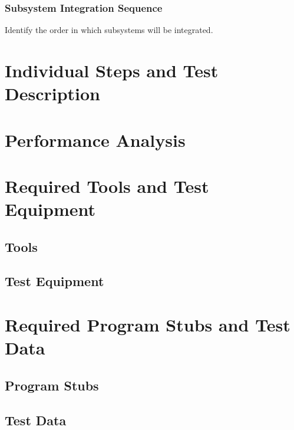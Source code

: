 \documentclass[a4paper]{article}
\begin{document}
\subsubsection{Subsystem Integration Sequence}
Identify the order in which subsystems will be integrated.

\newpage
\section{Individual Steps and Test Description}

\section{Performance Analysis}

\section{Required Tools and Test Equipment}
\subsection{Tools}
\subsection{Test Equipment}

\section{Required Program Stubs and Test Data}
\subsection{Program Stubs}
\subsection{Test Data}

\newpage
\end{document}
